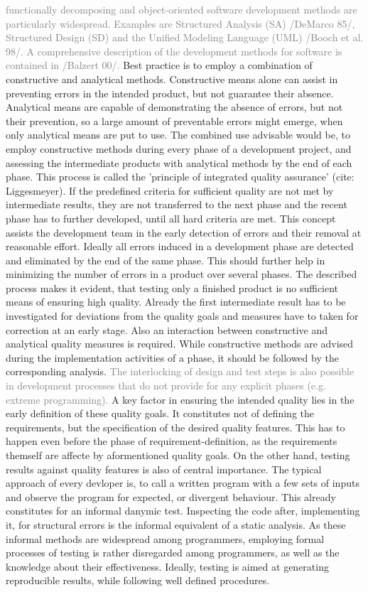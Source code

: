 \textcolor{gray}{  functionally decomposing and object-oriented software development methods are particularly widespread. Examples are Structured Analysis (SA) /DeMarco 85/, Structured Design (SD) and the Unified Modeling Language (UML) /Booch et al. 98/. A comprehensive description of the development methods for software is contained in /Balzert 00/.}
Best practice is to employ a combination of constructive and analytical methods. Constructive means alone can assist in preventing errors in the intended product, but not guarantee their absence. Analytical means are capable of demonstrating the absence of errors, but not their prevention, so a large amount of preventable errors might emerge, when only analytical means are put to use. The combined use advisable would be, to employ constructive methods during every phase of a development project, and assessing the intermediate products with analytical methods by the end of each phase. This process is called the 'principle of integrated quality assurance' (cite: Liggesmeyer). If the predefined criteria for sufficient quality are not met by intermediate results, they are not transferred to the next phase and the recent phase has to further developed, until all hard criteria are met. This concept assists the development team in the early detection of errors and their removal at reasonable effort. Ideally all errors induced in a development phase are detected and eliminated by the end of the same phase. This should further help in minimizing the number of errors in a product over several phases.
The described process makes it evident, that testing only a finished product is no sufficient means of ensuring high quality. Already the first intermediate result has to be investigated for deviations from the quality goals and measures have to taken for correction at an early stage. Also an interaction between constructive and analytical quality measures is required. While constructive methods are advised during the implementation activities of a phase, it should be followed by the corresponding analysis.
\textcolor{gray}{The interlocking of design and test steps is also possible in development processes that do not provide for any explicit phases (e.g. extreme programming). }
A key factor in ensuring the intended quality lies in the early definition of these quality goals. It constitutes not of defining the requirements, but the specification of the desired quality features. This has to happen even before the phase of requirement-definition, as the requirements themself are affecte by aformentioned quality goals. On the other hand, testing results against quality features is also of central importance. The typical approach of every devloper is, to call a written program with a few sets of inputs and observe the program for expected, or divergent behaviour. This already constitutes for an informal danymic test. Inspecting the code after, implementing it, for structural errors is the informal equivalent of a static analysis. As these informal methods are widespread among programmers, employing formal processes of testing is rather disregarded among programmers, as well as the knowledge about their effectiveness. Ideally, testing is aimed at generating reproducible results, while following well defined procedures.


